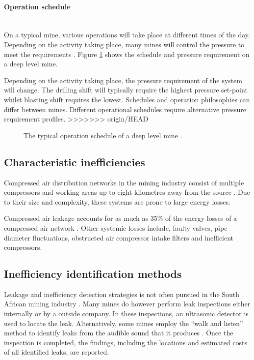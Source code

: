 	\paragraph*{Operation schedule}\leavevmode\\
	On a typical mine, various operations will take place at different times of the day. Depending on the activity taking place, many mines will control the pressure to meet the requirements \cite{Kriel2014Masters,Marais2012PhD}. Figure \ref{fig: Mining schedule} shows the schedule and pressure requirement on a deep level mine. 
	\par 
	 Depending on the activity taking place, the pressure requirement of the system will change. The drilling shift will typically require the highest pressure set-point whilst blasting shift requires the lowest. Schedules and operation philosophies can differ between mines. Different operational schedules require alternative pressure requirement profiles.
>>>>>>> origin/HEAD
	\begin{figure}[h]
		\centering
		\fbox{}
		\caption[A typical operation schedule of a deep level mine.]{The typical operation schedule of a deep level mine \cite{Kriel2014Masters}.}
		\label{fig: Mining schedule}
	\end{figure}
	\subsection{Characteristic inefficiencies}
	Compressed air distribution networks in the mining industry consist of multiple compressors and working areas up to eight kilometres away from the source \cite{Marais2012PhD}. Due to their size and complexity, these systems are prone to large energy losses.
	\par 
	Compressed air leakage accounts for as much as 35\% of the energy losses of a compressed air network \cite{Lawrence2004Improving}. Other systemic losses include, faulty valves, pipe diameter fluctuations, obstructed air compressor intake filters and inefficient compressors. 	
	\subsection{Inefficiency identification methods}
	Leakage and inefficiency detection strategies is not often pursued in the South African mining industry \cite{vanTonder2010Masters}. Many mines do however perform leak inspections either internally or by a outside company. In these inspections, an ultrasonic detector is used to locate the leak. Alternatively, some mines employ the \enquote{walk and listen} method to identify leaks from the audible sound that it produces \cite{vanTonder2010Masters}. Once the inspection is completed, the findings, including the locations and estimated costs of all identified leaks, are reported.

